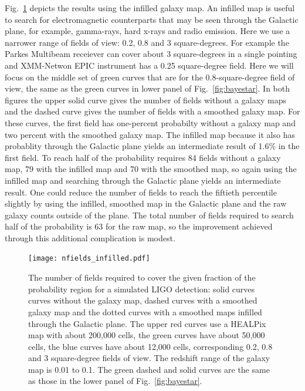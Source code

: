 \documentclass[useAMS,usenatbib]{mn2e}
\begin{document}
Fig.~\ref{fig:bayestar_inf} depicts the results using the infilled
galaxy map.  An infilled map is useful to search for electromagnetic
counterparts that may be seen through the Galactic plane, for example,
gamma-rays, hard x-rays and radio emission.  Here we use a narrower
range of fields of view: 0.2, 0.8 and 3 square-degrees.  For example
the Parkes Multibeam receiever\citep{1996PASA...13..243S} can cover
about 3 square-degrees in a single pointing and XMM-Netwon EPIC
instrument has a 0.25 square-degree field.  Here we will focus on the
middle set of green curves that are for the 0.8-square-degree field of
view, the same as the green curves in lower panel of
Fig.~\ref{fig:bayestar}.  In both figures the upper solid curve gives
the number of fields without a galaxy maps and the dashed curve gives
the number of fields with a smoothed galaxy map.  For these curves,
the first field has one-percent probabilty without a galaxy map and
two percent with the smoothed galaxy map.  The infilled map because it
also has probablity through the Galactic plane yields an intermediate
result of 1.6\% in the first field. To reach half of the probability
requires 84 fields without a galaxy map, 79 with the infilled map and
70 with the smoothed map, so again using the infilled map and
searching through the Galactic plane yields an intermediate result.
One could reduce the number of fields to reach the fiftieth percentile
slightly by using the infilled, smoothed map in the Galactic plane and
the raw galaxy counts outside of the plane.  The total number of
fields required to search half of the probability is 63 for the raw
map, so the improvement achieved through this additional complication
is modest.
\begin{figure}
  \texttt{[image: nfields\_infilled.pdf]}
  \caption{The number of fields required to cover the given fraction
    of the probability region for a simulated LIGO detection: solid
    curves curves without the galaxy map, dashed curves with a
    smoothed galaxy map and the dotted curves with a smoothed maps
    infilled through the Galactic plane.  The upper red curves use a
    HEALPix map with about 200,000 cells, the green curves have about
    50,000 cells, the blue curves have about 12,000 cells,
    corresponding 0.2, 0.8 and 3 square-degree fields of view. The
    redshift range of the galaxy map is 0.01 to 0.1. The green dashed
    and solid curves are the same as those in the lower panel of
    Fig.~\ref{fig:bayestar}.}
  \label{fig:bayestar_inf}
\end{figure}
\end{document}
